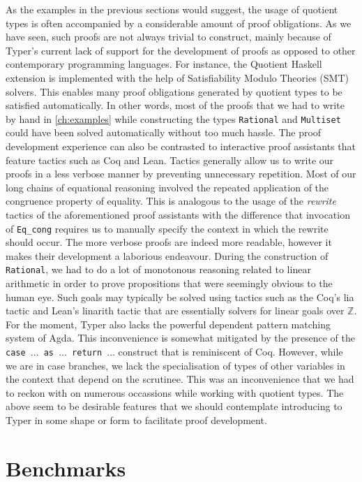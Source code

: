 \documentclass[12pt,twoside,maitrise]{dms}
\theoremstyle{definition}
\numberwithin{equation}{section}
\numberwithin{table}{chapter}
\numberwithin{figure}{chapter}
\newcommand\kw[1] {\textsf{#1}}
\newcommand\id[1] {\texttt{#1}}
\newcommand\fn[1] {\texttt{#1}}
\begin{document}
As the examples in the previous sections would suggest, the usage of quotient
types is often accompanied by a considerable amount of proof obligations. As we
have seen, such proofs are not always trivial to construct, mainly because of
Typer's current lack of support for the development of proofs as opposed to
other contemporary programming languages. For instance, the Quotient Haskell
extension\cite{hewer2023quotient} is implemented with the help of Satisfiability
Modulo Theories (SMT) solvers. This enables many proof obligations generated by
quotient types to be satisfied automatically. In other words, most of the proofs
that we had to write by hand in \autoref{ch:examples} while constructing the
types \id{Rational} and \id{Multiset} could have been solved automatically
without too much hassle. The proof development experience can also be contrasted
to interactive proof assistants that feature tactics such as Coq and Lean.
Tactics generally allow us to write our proofs in a less verbose manner by
preventing unnecessary repetition. Most of our long chains of equational
reasoning involved the repeated application of the congruence property of
equality. This is analogous to the usage of the \emph{rewrite} tactics of the
aforementioned proof assistants with the difference that invocation of
\id{Eq\_cong} requires us to manually specify the context in which the rewrite
should occur. The more verbose proofs are indeed more readable, however it makes
their development a laborious endeavour. During the construction of
\id{Rational}, we had to do a lot of monotonous reasoning related to linear
arithmetic in order to prove propositions that were seemingly obvious to the
human eye. Such goals may typically be solved using tactics such as the Coq's
\kw{lia} tactic and Lean's \kw{linarith} tactic that are essentially solvers for
linear goals over $\mathbb{Z}$. For the moment, Typer also lacks the powerful
dependent pattern matching system of Agda. This inconvenience is somewhat
mitigated by the presence of the \fn{\kw{case} $\ldots$ \kw{as} $\ldots$
  \kw{return} $\ldots$} construct that is reminiscent of Coq. However, while we
are in \kw{case} branches, we lack the specialisation of types of other
variables in the context that depend on the scrutinee. This was an inconvenience
that we had to reckon with on numerous occassions while working with quotient
types. The above seem to be desirable features that we should contemplate
introducing to Typer in some shape or form to facilitate proof development.

\section*{Benchmarks}
\end{document}
